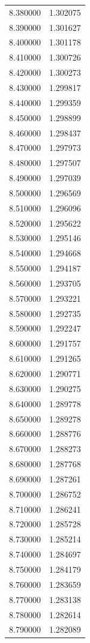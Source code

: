 \begin{tabular}{rr}
8.380000 & 1.302075 \\
8.390000 & 1.301627 \\
8.400000 & 1.301178 \\
8.410000 & 1.300726 \\
8.420000 & 1.300273 \\
8.430000 & 1.299817 \\
8.440000 & 1.299359 \\
8.450000 & 1.298899 \\
8.460000 & 1.298437 \\
8.470000 & 1.297973 \\
8.480000 & 1.297507 \\
8.490000 & 1.297039 \\
8.500000 & 1.296569 \\
8.510000 & 1.296096 \\
8.520000 & 1.295622 \\
8.530000 & 1.295146 \\
8.540000 & 1.294668 \\
8.550000 & 1.294187 \\
8.560000 & 1.293705 \\
8.570000 & 1.293221 \\
8.580000 & 1.292735 \\
8.590000 & 1.292247 \\
8.600000 & 1.291757 \\
8.610000 & 1.291265 \\
8.620000 & 1.290771 \\
8.630000 & 1.290275 \\
8.640000 & 1.289778 \\
8.650000 & 1.289278 \\
8.660000 & 1.288776 \\
8.670000 & 1.288273 \\
8.680000 & 1.287768 \\
8.690000 & 1.287261 \\
8.700000 & 1.286752 \\
8.710000 & 1.286241 \\
8.720000 & 1.285728 \\
8.730000 & 1.285214 \\
8.740000 & 1.284697 \\
8.750000 & 1.284179 \\
8.760000 & 1.283659 \\
8.770000 & 1.283138 \\
8.780000 & 1.282614 \\
8.790000 & 1.282089 \\

\end{tabular}
